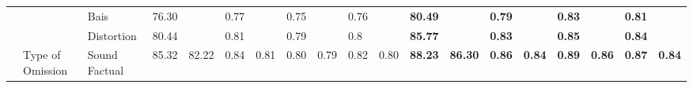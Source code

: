 \begin{table}[!tbh]
{\begin{tabular}{l|l|l|llllllll||llllllll}
                                                                                               &                                  & Bais                     & \multicolumn{1}{l|}{76.30} & \multicolumn{1}{l|}{}                        & \multicolumn{1}{l|}{0.77} & \multicolumn{1}{l|}{}                       & \multicolumn{1}{l|}{0.75} & \multicolumn{1}{l|}{}                       & \multicolumn{1}{l|}{0.76} &                        & \multicolumn{1}{l|}{\cellcolor[HTML]{FFFE65}\textbf{80.49}} & \multicolumn{1}{l|}{\cellcolor[HTML]{FFFE65}}                                 & \multicolumn{1}{l|}{\cellcolor[HTML]{FFFE65}\textbf{0.79}} & \multicolumn{1}{l|}{\cellcolor[HTML]{FFFE65}}                                & \multicolumn{1}{l|}{\cellcolor[HTML]{FFFE65}\textbf{0.83}} & \multicolumn{1}{l|}{\cellcolor[HTML]{FFFE65}}                                & \multicolumn{1}{l|}{\cellcolor[HTML]{FFFE65}\textbf{0.81}} & \cellcolor[HTML]{FFFE65}                                \\ \cline{3-4} \cline{6-6} \cline{8-8} \cline{10-10} \cline{12-12} \cline{14-14} \cline{16-16} \cline{18-18}
                                                                                               &                                  & Distortion               & \multicolumn{1}{l|}{80.44} & \multicolumn{1}{l|}{}                        & \multicolumn{1}{l|}{0.81} & \multicolumn{1}{l|}{}                       & \multicolumn{1}{l|}{0.79} & \multicolumn{1}{l|}{}                       & \multicolumn{1}{l|}{0.8}  &                        & \multicolumn{1}{l|}{\cellcolor[HTML]{FFFE65}\textbf{85.77}} & \multicolumn{1}{l|}{\cellcolor[HTML]{FFFE65}}                                 & \multicolumn{1}{l|}{\cellcolor[HTML]{FFFE65}\textbf{0.83}} & \multicolumn{1}{l|}{\cellcolor[HTML]{FFFE65}}                                & \multicolumn{1}{l|}{\cellcolor[HTML]{FFFE65}\textbf{0.85}} & \multicolumn{1}{l|}{\cellcolor[HTML]{FFFE65}}                                & \multicolumn{1}{l|}{\cellcolor[HTML]{FFFE65}\textbf{0.84}} & \cellcolor[HTML]{FFFE65}                                \\ \cline{3-4} \cline{6-6} \cline{8-8} \cline{10-10} \cline{12-12} \cline{14-14} \cline{16-16} \cline{18-18}
                                                                                               & \multirow{-5}{*}{Type of Omission}     & Sound Factual            & \multicolumn{1}{l|}{85.32} & \multicolumn{1}{l|}{\multirow{-5}{*}{82.22}} & \multicolumn{1}{l|}{0.84} & \multicolumn{1}{l|}{\multirow{-5}{*}{0.81}} & \multicolumn{1}{l|}{0.80} & \multicolumn{1}{l|}{\multirow{-5}{*}{0.79}} & \multicolumn{1}{l|}{0.82} & \multirow{-5}{*}{0.80} & \multicolumn{1}{l|}{\cellcolor[HTML]{FFFE65}\textbf{88.23}} & \multicolumn{1}{l|}{\multirow{-5}{*}{\cellcolor[HTML]{FFFE65}\textbf{86.30}}} & \multicolumn{1}{l|}{\cellcolor[HTML]{FFFE65}\textbf{0.86}} & \multicolumn{1}{l|}{\multirow{-5}{*}{\cellcolor[HTML]{FFFE65}\textbf{0.84}}} & \multicolumn{1}{l|}{\cellcolor[HTML]{FFFE65}\textbf{0.89}} & \multicolumn{1}{l|}{\multirow{-5}{*}{\cellcolor[HTML]{FFFE65}\textbf{0.86}}} & \multicolumn{1}{l|}{\cellcolor[HTML]{FFFE65}\textbf{0.87}} & \multirow{-5}{*}{\cellcolor[HTML]{FFFE65}\textbf{0.84}} \\ \cline{2-19} 

\end{tabular}}
\end{table}
